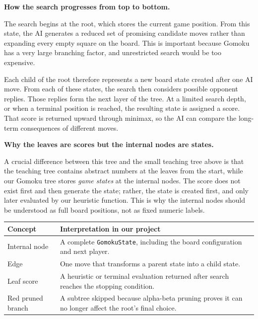 \documentclass[11pt]{article}
\begin{document}
\noindent
\textbf{How the search progresses from top to bottom.}

The search begins at the root, which stores the current game position. From this state, the AI generates a reduced set of promising candidate moves rather than expanding every empty square on the board. This is important because Gomoku has a very large branching factor, and unrestricted search would be too expensive.

Each child of the root therefore represents a new board state created after one AI move. From each of these states, the search then considers possible opponent replies. Those replies form the next layer of the tree. At a limited search depth, or when a terminal position is reached, the resulting state is assigned a score. That score is returned upward through minimax, so the AI can compare the long-term consequences of different moves.

\noindent
\textbf{Why the leaves are scores but the internal nodes are states.}

A crucial difference between this tree and the small teaching tree above is that the teaching tree contains abstract numbers at the leaves from the start, while our Gomoku tree stores \emph{game states} at the internal nodes. The score does not exist first and then generate the state; rather, the state is created first, and only later evaluated by our heuristic function. This is why the internal nodes should be understood as full board positions, not as fixed numeric labels.

\begin{center}
\begin{tabularx}{0.96\textwidth}{>{\raggedright\arraybackslash}p{} X}
\toprule
\textbf{Concept} & \textbf{Interpretation in our project} \\
\midrule
Internal node & A complete \texttt{GomokuState}, including the board configuration and next player. \\
Edge & One move that transforms a parent state into a child state. \\
Leaf score & A heuristic or terminal evaluation returned after search reaches the stopping condition. \\
Red pruned branch & A subtree skipped because alpha-beta pruning proves it can no longer affect the root's final choice. \\
\bottomrule
\end{tabularx}
\end{center}
\end{document}
